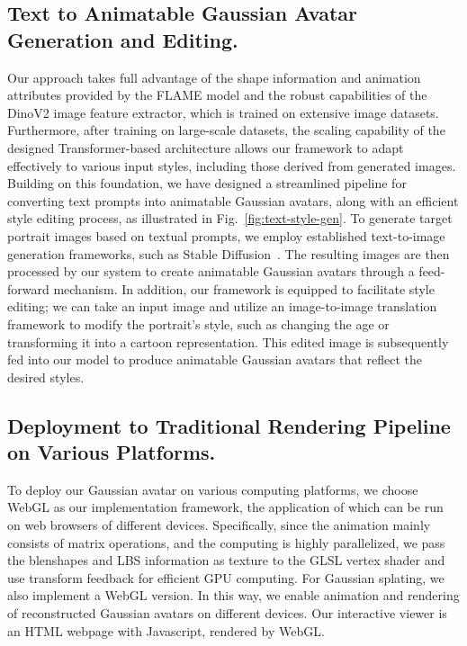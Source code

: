 \subsection{Text to Animatable Gaussian Avatar Generation and Editing.}
Our approach takes full advantage of the shape information and animation attributes provided by the FLAME model and the robust capabilities of the DinoV2 image feature extractor, which is trained on extensive image datasets. Furthermore, after training on large-scale datasets, the scaling capability of the designed Transformer-based architecture allows our framework to adapt effectively to various input styles, including those derived from generated images. Building on this foundation, we have designed a streamlined pipeline for converting text prompts into animatable Gaussian avatars, along with an efficient style editing process, as illustrated in Fig.~\ref{fig:text-style-gen}. To generate target portrait images based on textual prompts, we employ established text-to-image generation frameworks, such as Stable Diffusion~\cite{stablediffusion}. The resulting images are then processed by our system to create animatable Gaussian avatars through a feed-forward mechanism. In addition, our framework is equipped to facilitate style editing; we can take an input image and utilize an image-to-image translation framework to modify the portrait's style, such as changing the age or transforming it into a cartoon representation. This edited image is subsequently fed into our model to produce animatable Gaussian avatars that reflect the desired styles.

\subsection{Deployment to Traditional Rendering Pipeline on Various Platforms.}
\label{sec:deploy_various_devices}
To deploy our Gaussian avatar on various computing platforms, we choose WebGL as our implementation framework, the application of which can be run on web browsers of different devices. Specifically, since the animation mainly consists of matrix operations, and the computing is highly parallelized, we pass the blenshapes and LBS information as texture to the GLSL vertex shader and use transform feedback for efficient GPU computing. For Gaussian splating, we also implement a WebGL version. In this way, we enable animation and rendering of reconstructed Gaussian avatars on different devices. Our interactive viewer is an HTML webpage with Javascript, rendered by WebGL.

